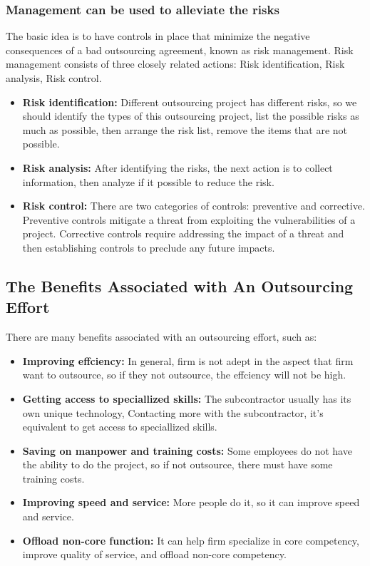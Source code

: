 \documentclass[twocolumn,UTF8]{article}
\begin{document}
\subsubsection{Management can be used to alleviate the risks}
The basic idea is to have controls in place that minimize the negative consequences of a bad outsourcing agreement, known as risk management.
Risk management consists of three closely related actions: Risk identification, Risk analysis, Risk control.
\begin{itemize}
\item \textbf{Risk identification:} Different outsourcing project has different risks, so we should identify the types of this outsourcing project, list the possible risks as much as possible, then arrange the risk list, remove the items that are not possible.
\item \textbf{Risk analysis:} After identifying the risks, the next action is to collect information, then analyze if it possible to reduce the risk.
\item \textbf{Risk control:} There are two categories of controls: preventive and corrective. Preventive controls mitigate a threat from exploiting the vulnerabilities of a project. Corrective controls require addressing the impact of a threat and then establishing controls to preclude any future impacts.
\end{itemize}


\subsection{The Benefits Associated with An Outsourcing Effort}
There are many benefits associated with an outsourcing effort, such as:
\begin{itemize}
\item \textbf{Improving effciency:} In general, firm is not adept in the aspect that firm want to outsource, so if they not outsource, the effciency will not be high.
\item \textbf{Getting access to speciallized skills:} The subcontractor usually has its own unique technology, Contacting more with the subcontractor, it's equivalent to get access to speciallized skills.
\item \textbf{Saving on manpower and training costs:} Some employees do not have the ability to do the project, so if not outsource, there must have some training costs.
\item \textbf{Improving speed and service:} More people do it, so it can improve speed and service.
\item \textbf{Offload non-core function:} It can help firm specialize in core competency, improve quality of service, and offload non-core competency.
\end{itemize}
\end{document}
